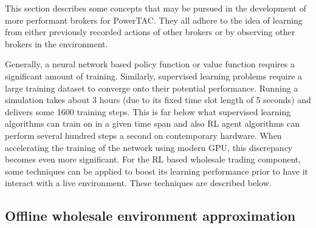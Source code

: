 This section describes some concepts that may be pursued in the development of more performant brokers for
\ac{PowerTAC}. They all adhere to the idea of learning from either previously recorded actions of other brokers or by
observing other brokers in the environment.

Generally, a neural network based policy function or value function requires a significant amount of training.
Similarly, supervised learning problems require a large training dataset to converge onto their potential performance.
Running a simulation takes about 3 hours (due to its fixed time slot length of 5 seconds) and delivers some 1600
training steps. This is far below what supervised learning algorithms can train on in a given time span and also \ac{RL}
agent algorithms can perform several hundred steps a second on contemporary hardware. When accelerating the training of
the network using modern \ac{GPU}, this discrepancy becomes even more significant. For the \ac{RL} based wholesale
trading component, some techniques can be applied to boost its learning performance prior to have it interact with a
live environment.  These techniques are described below.

\subsection{Offline wholesale environment approximation}%
\label{ssub:offline_record_based_wholesale_environment_approximation}

